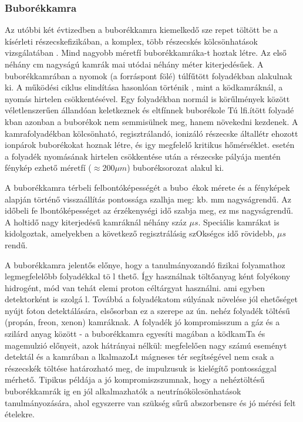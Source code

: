 \documentclass[../main.tex]{subfiles}
\begin{document}
\subsubsection*{Buborékkamra}
Az utóbbi két évtizedben a buborékkamra kiemelkedő sze repet töltött be
a kísérleti részecskefizikában, a komplex, több részecskés kölcsönhatások
vizsgálatában . Mind nagyobb méretfí buborékkamráka-t hoztak létre. Az
első néhány cm nagyságú kamrák mai utódai néhány méter kiterjedésűek.
A buborékkamrában a nyomok (a forráspont fölé) túlfűtött folyadékban alakulnak ki. A működési ciklus elindítása hasonlóan történik , mint a
ködkamráknál, a nyomás hirtelen csökkentésével.
Egy folyadékban normál is körűlmények között véletlenszerűen állandóan keletkeznek és eltfínnek buborékole Tú lfi.ítött folyadé kban azonban
a buborékok nem semmisülnek meg, hanem növekedni kezdenek. A kamrafolyadékban kölcsönható, regisztrálandó, ionizáló részecske általlétr ehozott
ionpárok buborékokat hoznak létre, és igy megfelelő kritikus hőmérséklet.
esetén a folyadék nyomásának hirtelen csökkentése után a részecske pályája
mentén fénykép ezhető méretfí ($\approx 200 \mu m$) buboréksorozat alakul ki.

A buborékkamra térbeli felbontóképességét a bubo~ékok mérete és a
fényképek alapján történő visszaállítás pontossága szalhja meg: kb. mm
nagyságrendű. Az időbeli fe lbontóképességet az érzékenységi idő szabja meg,
ez ms nagyságrendű. A holtidő nagy kiterjedésű kamráknál néhány száz $\mu s$.
Speciális kamrákat is kidolgoztak, amelyekben a következő regisztrálásig
szOkségcs idő rövidebb, $\mu s$ rendű.

A buborékkamra jelentős előnye, hogy a tanulmányozandó fizikai folyamathoz legmegfelelőbb folyadékkal tö l thető. Így használnak töltőanyag
ként folyékony hidrogént, mód van tehát elemi proton céltárgyat használni.
ami egyben detektorként is szolgá l. Továbbá a folyadékatom súlyának növelése jól ehetőséget nyújt foton detektálására, elsősorban ez a szerepe az
ún. nehéz folyadék töltésű (propán, freon, xenon) kamráknak. A folyadék jó
kompromisszum a gáz és a szilárd anyag között - a buborékkamra egyesíti
magában a ködkamTa és magemulzió előnyeit, azok hátrányai nélkül: megfelelően nagy számú eseményt detektál és a kamrában a lkalmazoLt mágneses
tér segítségével nem csak a részecskék töltése határozható meg, de impulzusuk is kielégítő pontossággal mérhető. Tipikus példája a jó kompromiszszumnak,
hogy a nehéztöltésű buborékkamrák ig en jól alkalmazhatók a neutrínókölcsönhatások tanulmányozására, ahol egyszerre van szükség sűrű abszorbensre és jó mérési felt ételekre.
\end{document}
